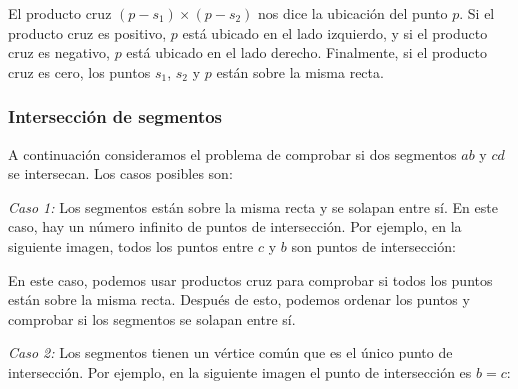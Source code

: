 El producto cruz $(p-s_1) \times (p-s_2)$
nos dice la ubicación del punto $p$.
Si el producto cruz es positivo,
$p$ está ubicado en el lado izquierdo,
y si el producto cruz es negativo,
$p$ está ubicado en el lado derecho.
Finalmente, si el producto cruz es cero,
los puntos $s_1$, $s_2$ y $p$ están sobre la misma recta.

\subsubsection{Intersección de segmentos}


A continuación consideramos el problema de comprobar
si dos segmentos
$ab$ y $cd$ se intersecan. Los casos posibles son:

\textit{Caso 1:}
Los segmentos están sobre la misma recta
y se solapan entre sí.
En este caso, hay un número infinito de
puntos de intersección.
Por ejemplo, en la siguiente imagen,
todos los puntos entre $c$ y $b$ son
puntos de intersección:
\begin{center}
\end{center}

En este caso, podemos usar productos cruz para
comprobar si todos los puntos están sobre la misma recta.
Después de esto, podemos ordenar los puntos y comprobar
si los segmentos se solapan entre sí.

\textit{Caso 2:}
Los segmentos tienen un vértice común
que es el único punto de intersección.
Por ejemplo, en la siguiente imagen el
punto de intersección es $b=c$:

\begin{center}
\end{center}

